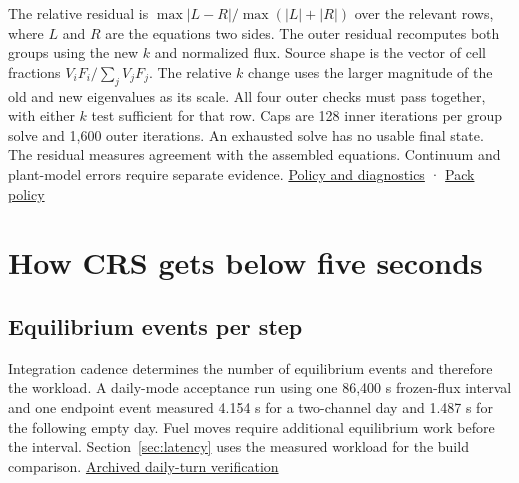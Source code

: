 \documentclass[11pt,letterpaper]{article}
\begin{document}
The relative residual is \(\max\lvert L-R\rvert/\max(\lvert L\rvert+\lvert
R\rvert)\) over the relevant rows, where \(L\) and \(R\) are the
equation\textquotesingle s two sides. The outer residual recomputes both groups using
the new \(k\) and normalized flux. Source shape is the vector of cell fractions
\(V_iF_i/\sum_j V_jF_j\). The relative \(k\) change uses the larger magnitude of the old
and new eigenvalues as its scale. All four outer checks must pass together, with either
\(k\) test sufficient for that row. Caps are 128 inner iterations per group solve and
1,600 outer iterations. An exhausted solve has no usable final state. The residual
measures agreement with the assembled equations. Continuum and plant-model errors
require separate evidence.
\href{https://github.com/hkkho/CRS/blob/4341ae8881f5827988c3d8b1859aa9e8f13cd8a6/src/ReactorSim.Core/Domain/SpatialConvergenceContracts.cs\#L455}{Policy
and diagnostics} ·
\href{https://github.com/hkkho/CRS/blob/4341ae8881f5827988c3d8b1859aa9e8f13cd8a6/data/packs/candu6-two-group-diffusion-pack-v1.json}{Pack
policy}

\section{How CRS gets below five seconds}\label{how-crs-gets-below-five-seconds}

\subsection{Equilibrium events per step}\label{fewer-equilibrium-events}

Integration cadence determines the number of equilibrium events and therefore the
workload. A daily-mode acceptance run using one 86,400 s frozen-flux interval and one endpoint
event measured 4.154 s for a two-channel day and 1.487 s for the following empty day.
Fuel moves require additional equilibrium work before the interval.
Section~\ref{sec:latency} uses the measured workload for the build comparison.
\href{https://github.com/hkkho/CRS/blob/2015dd334782358e910681bbd10f25d8fb3cf2d7/docs/performance/daily-turns.md}{Archived
daily-turn verification}
\end{document}

